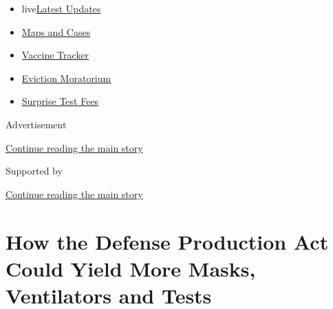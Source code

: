 \begin{itemize}
\tightlist
\item
  live\href{https://www.nytimes3xbfgragh.onion/2020/09/09/world/covid-19-coronavirus.html?name=styln-coronavirus-national\&region=TOP_BANNER\&block=storyline_menu_recirc\&action=click\&pgtype=Article\&impression_id=432eef91-f2c5-11ea-9fa3-9f633d681c3c\&variant=undefined}{Latest
  Updates}
\item
  \href{https://www.nytimes3xbfgragh.onion/interactive/2020/us/coronavirus-us-cases.html?name=styln-coronavirus-national\&region=TOP_BANNER\&block=storyline_menu_recirc\&action=click\&pgtype=Article\&impression_id=432f16a0-f2c5-11ea-9fa3-9f633d681c3c\&variant=undefined}{Maps
  and Cases}
\item
  \href{https://www.nytimes3xbfgragh.onion/interactive/2020/science/coronavirus-vaccine-tracker.html?name=styln-coronavirus-national\&region=TOP_BANNER\&block=storyline_menu_recirc\&action=click\&pgtype=Article\&impression_id=432f16a1-f2c5-11ea-9fa3-9f633d681c3c\&variant=undefined}{Vaccine
  Tracker}
\item
  \href{https://www.nytimes3xbfgragh.onion/2020/09/02/your-money/eviction-moratorium-covid.html?name=styln-coronavirus-national\&region=TOP_BANNER\&block=storyline_menu_recirc\&action=click\&pgtype=Article\&impression_id=432f16a2-f2c5-11ea-9fa3-9f633d681c3c\&variant=undefined}{Eviction
  Moratorium}
\item
  \href{https://www.nytimes3xbfgragh.onion/2020/09/09/upshot/coronavirus-surprise-test-fees.html?name=styln-coronavirus-national\&region=TOP_BANNER\&block=storyline_menu_recirc\&action=click\&pgtype=Article\&impression_id=432f16a3-f2c5-11ea-9fa3-9f633d681c3c\&variant=undefined}{Surprise
  Test Fees}
\end{itemize}

Advertisement

\protect\hyperlink{after-top}{Continue reading the main story}

Supported by

\protect\hyperlink{after-sponsor}{Continue reading the main story}

\hypertarget{how-the-defense-production-act-could-yield-more-masks-ventilators-and-tests}{%
\section{How the Defense Production Act Could Yield More Masks,
Ventilators and
Tests}\label{how-the-defense-production-act-could-yield-more-masks-ventilators-and-tests}}

